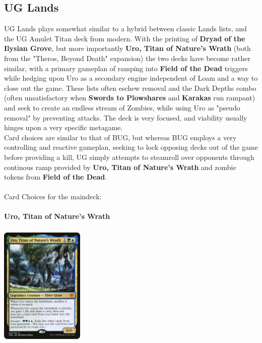 \documentclass{report}
\begin{document}
\subsection{UG Lands}
UG Lands plays somewhat similar to a hybrid between classic Lands lists, and the UG Amulet Titan deck from modern. With the printing of \textbf{Dryad of the Ilysian Grove}, but more importantly \textbf{Uro, Titan of Nature's Wrath} (both from  the "Theros, Beyond Death" expansion) the two decks have become rather similar, with a primary gameplan of ramping into \textbf{Field of the Dead} triggers while hedging upon Uro as a secondary engine independent of Loam and a way to close out the game. These lists often eschew removal and the Dark Depths combo (often unsatisfactory when \textbf{Swords to Plowshares} and \textbf{Karakas} run rampant) and seek to create an endless stream of Zombies, while using Uro as "pseudo removal" by preventing attacks. The deck is very focused, and viability usually hinges upon a very specific metagame.\\
Card choices are similar to that of BUG, but whereas BUG employs a very controlling and reactive gameplan, seeking to lock opposing decks out of the game before providing a kill, UG simply attempts to steamroll over opponents through continous ramp provided by \textbf{Uro, Titan of Nature's Wrath} and zombie tokens from \textbf{Field of the Dead}.\\\\
Card Choices for the maindeck:\\\\
\textbf{Uro, Titan of Nature's Wrath}
\begin{center}
\includegraphics [width = 4cm, height = 6cm] {uro}
\end{center}
\end{document}
